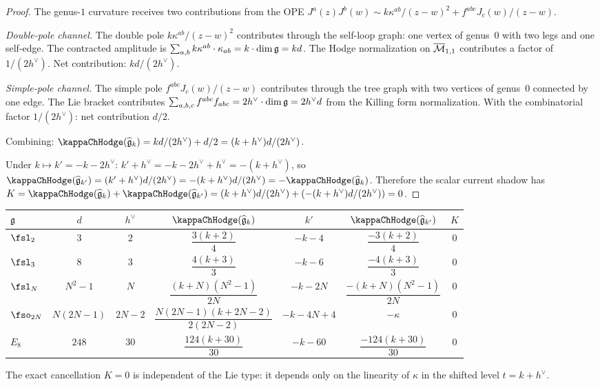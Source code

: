 \begin{proof}
The genus-$1$ curvature receives two contributions from the OPE
$J^a(z)J^b(w) \sim k\kappa^{ab}/(z-w)^2 + f^{abc}J_c(w)/(z-w)$.

\emph{Double-pole channel.}
The double pole $k\kappa^{ab}/(z-w)^2$ contributes through the
self-loop graph: one vertex of genus~$0$ with two legs and one
self-edge. The contracted amplitude is
$\sum_{a,b} k\kappa^{ab} \cdot \kappa_{ab} = k \cdot \dim\mathfrak{g} = kd$.
The Hodge normalization on $\overline{\mathcal{M}}_{1,1}$ contributes a factor
of $1/(2h^\vee)$. Net contribution: $kd/(2h^\vee)$.

\emph{Simple-pole channel.}
The simple pole $f^{abc}J_c(w)/(z-w)$ contributes through the tree
graph with two vertices of genus~$0$ connected by one edge. The
Lie bracket contributes $\sum_{a,b,c} f^{abc}f_{abc}
= 2h^\vee \cdot \dim\mathfrak{g} = 2h^\vee d$ from the Killing form
normalization. With the combinatorial factor $1/(2h^\vee)$:
net contribution $d/2$.

Combining: $\kappaChHodge(\widehat{\fg}_k)
= kd/(2h^\vee) + d/2 = (k + h^\vee)d/(2h^\vee)$.

Under $k \mapsto k' = -k - 2h^\vee$:
$k' + h^\vee = -k - 2h^\vee + h^\vee = -(k + h^\vee)$, so
$\kappaChHodge(\widehat{\fg}_{k'})
= (k'+h^\vee)d/(2h^\vee)
= -(k + h^\vee)d/(2h^\vee) = -\kappaChHodge(\widehat{\fg}_k)$.
Therefore the scalar current shadow has
$K = \kappaChHodge(\widehat{\fg}_k) + \kappaChHodge(\widehat{\fg}_{k'})
= (k+h^\vee)d/(2h^\vee) + (-(k+h^\vee)d/(2h^\vee)) = 0$.
\end{proof}

\begin{computation}
\renewcommand{\arraystretch}{1.4}
\begin{center}
\begin{tabular}{lcccccc}
\toprule
$\mathfrak{g}$ & $d$ & $h^\vee$ & $\kappaChHodge(\widehat{\fg}_k)$ & $k'$ &
$\kappaChHodge(\widehat{\fg}_{k'})$ & $K$ \\
\midrule
$\fsl_2$ & $3$ & $2$ & $\dfrac{3(k+2)}{4}$ & $-k-4$ &
$\dfrac{-3(k+2)}{4}$ & $0$ \\[6pt]
$\fsl_3$ & $8$ & $3$ & $\dfrac{4(k+3)}{3}$ & $-k-6$ &
$\dfrac{-4(k+3)}{3}$ & $0$ \\[6pt]
$\fsl_N$ & $N^2{-}1$ & $N$ & $\dfrac{(k{+}N)(N^2{-}1)}{2N}$ & $-k-2N$ &
$\dfrac{-(k{+}N)(N^2{-}1)}{2N}$ & $0$ \\[6pt]
$\fso_{2N}$ & $N(2N{-}1)$ & $2N{-}2$ & $\dfrac{N(2N{-}1)(k{+}2N{-}2)}{2(2N{-}2)}$ & $-k-4N+4$ &
$-\kappa$ & $0$ \\[6pt]
$E_8$ & $248$ & $30$ & $\dfrac{124(k+30)}{30}$ & $-k-60$ &
$\dfrac{-124(k+30)}{30}$ & $0$ \\
\bottomrule
\end{tabular}
\end{center}
The exact cancellation $K = 0$ is independent of the Lie type: it depends
only on the linearity of $\kappa$ in the shifted level $t = k + h^\vee$.
\end{computation}


